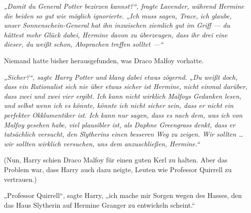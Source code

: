 \emph{„Damit du General Potter bezirzen kannst?“, fragte Lavender, während Hermine die beiden so gut wie möglich ignorierte.
„Ich muss sagen, Trace, ich glaube, unser Sonnenschein-General hat ihn inzwischen ziemlich gut im Griff — du hättest mehr Glück dabei, Hermine davon zu überzeugen, dass ihr drei eine dieser, du weißt schon, Absprachen treffen solltet —“}

Niemand hatte bisher herausgefunden, was Draco Malfoy vorhatte.

\emph{„Sicher?“, sagte Harry Potter und klang dabei etwas zögernd.
„Du weißt doch, dass ein Rationalist sich nie über etwas sicher ist Hermine, nicht einmal darüber, dass zwei und zwei vier ergibt. Ich kann nicht wirklich Malfoys Gedanken lesen, und selbst wenn ich es könnte, könnte ich nicht sicher sein, dass er nicht ein perfekter Okklumentiker ist. Ich kann nur sagen, dass es nach dem, was ich von Malfoy gesehen habe, viel plausibler ist, als Daphne Greengrass denkt, dass er tatsächlich versucht, den Slytherins einen besseren Weg zu zeigen. Wir sollten … wir sollten wirklich versuchen, uns dem anzuschließen, Hermine.“}

(Nun, Harry schien Draco Malfoy für einen guten Kerl zu halten. Aber das Problem war, dass Harry auch dazu neigte, Leuten wie Professor Quirrell zu vertrauen.)

\later

„Professor Quirrell“, sagte Harry, „ich mache mir Sorgen wegen des Hasses, den das Haus Slytherin auf Hermine Granger zu entwickeln scheint.“

